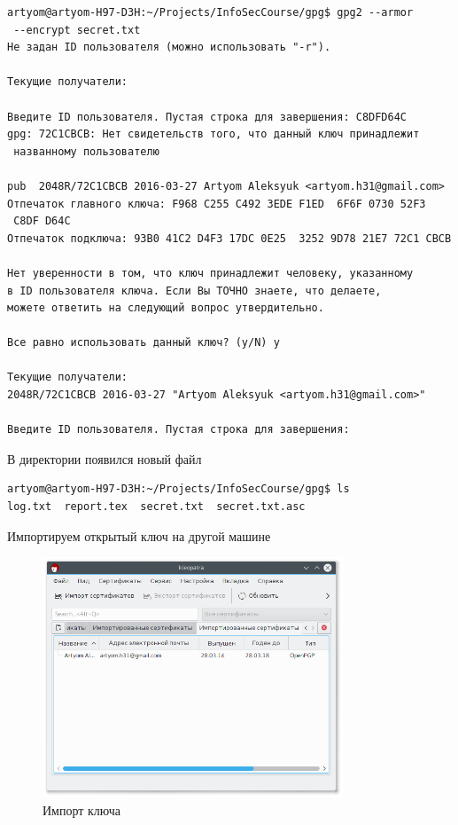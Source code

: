\begin{verbatim}
artyom@artyom-H97-D3H:~/Projects/InfoSecCourse/gpg$ gpg2 --armor
 --encrypt secret.txt 
Не задан ID пользователя (можно использовать "-r").

Текущие получатели:

Введите ID пользователя. Пустая строка для завершения: C8DFD64C
gpg: 72C1CBCB: Нет свидетельств того, что данный ключ принадлежит
 названному пользователю

pub  2048R/72C1CBCB 2016-03-27 Artyom Aleksyuk <artyom.h31@gmail.com>
Отпечаток главного ключа: F968 C255 C492 3EDE F1ED  6F6F 0730 52F3
 C8DF D64C
Отпечаток подключа: 93B0 41C2 D4F3 17DC 0E25  3252 9D78 21E7 72C1 CBCB

Нет уверенности в том, что ключ принадлежит человеку, указанному
в ID пользователя ключа. Если Вы ТОЧНО знаете, что делаете,
можете ответить на следующий вопрос утвердительно.

Все равно использовать данный ключ? (y/N) y

Текущие получатели:
2048R/72C1CBCB 2016-03-27 "Artyom Aleksyuk <artyom.h31@gmail.com>"

Введите ID пользователя. Пустая строка для завершения: 
\end{verbatim}

В директории появился новый файл

\begin{verbatim}
artyom@artyom-H97-D3H:~/Projects/InfoSecCourse/gpg$ ls
log.txt  report.tex  secret.txt  secret.txt.asc
\end{verbatim}

Импортируем открытый ключ на другой машине

\begin{figure}[H]
	\centering
	\includegraphics[width=0.8\textwidth]{figures/screen22.png}
	\caption{Импорт ключа}
\end{figure}

